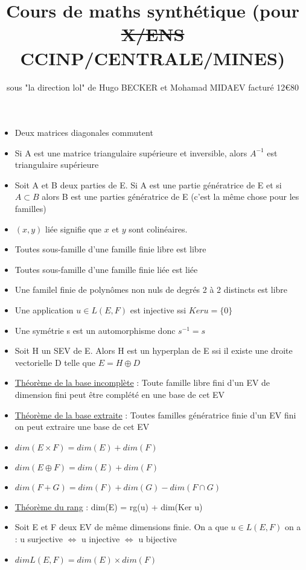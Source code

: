 \documentclass{book}
\title{Cours de maths synthétique (pour \sout{X/ENS} CCINP/CENTRALE/MINES)}
\author{sous "la direction lol" de Hugo BECKER et Mohamad MIDAEV facturé 12\euro 80}
\begin{document}
\maketitle

\begin{itemize}[label=$\ast$]
    	\item Deux matrices diagonales commutent
    	\item Si A est une matrice triangulaire supérieure et inversible, alors $A^{-1}$ est triangulaire supérieure
	\item Soit A et B deux parties de E. Si A est une partie génératrice de E et si \( A \subset B \) alors B est une parties génératrice de E (c'est la même chose pour les familles)
	\item \( (x,y) \) liée signifie que \( x \) et \( y \) sont colinéaires.
	\item Toutes sous-famille d'une famille finie libre est libre
	\item Toutes sous-famille d'une famille finie liée est liée
	\item Une familel finie de polynômes non nuls de degrés 2 à 2 distincts est libre
	\item Une application \(u \in L(E,F) \) est injective ssi \(Ker u = \{0\} \)
	\item Une symétrie s est un automorphisme donc \(s^{-1} = s \)
	\item Soit H un SEV de E. Alors H est un hyperplan de E ssi il existe une droite vectorielle D telle que \(E = H \oplus D \)
	\item \underline{Théorème de la base incomplète} : Toute famille libre fini d'un EV de dimension fini peut être complété en une base de cet EV
	\item \underline{Théorème de la base extraite} : Toutes familles génératrice finie d'un EV fini on peut extraire une base de cet EV
	\item \( dim(E \times F) = dim(E) + dim(F) \)
	\item \( dim(E \oplus F) = dim(E) + dim(F) \)
	\item \( dim(F + G) = dim(F) + dim(G) - dim(F \cap G) \)
	\item \underline{Théorème du rang} : dim(E)  = rg(u) + dim(Ker u)
	\item Soit E et F deux EV de même dimensions finie. On a que \(u \in L(E,F) \) on a :  u surjective \( \Leftrightarrow \) u injective \( \Leftrightarrow \) u bijective
	\item \(dim L(E,F) = dim(E) \times dim(F) \)

\end{itemize}
\end{document}
